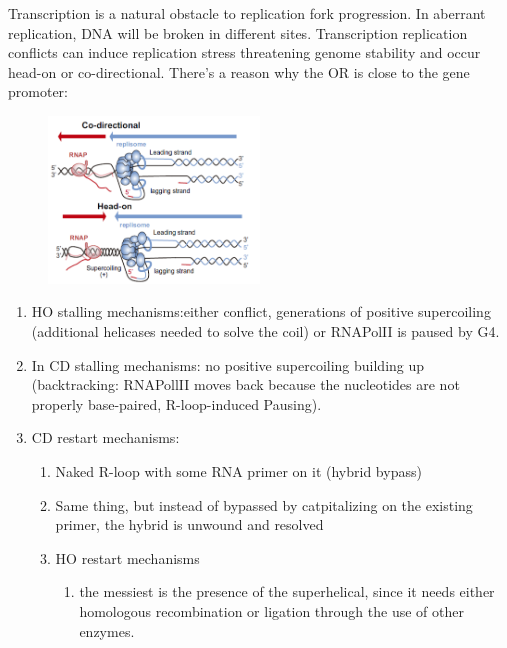 Transcription is a natural obstacle to replication fork progression. In
aberrant replication, DNA will be broken in different sites. 
Transcription replication conflicts can induce replication stress
threatening genome stability and
occur head-on or co-directional. There's a reason why the OR is close to
the gene promoter:

\begin{figure}[h!]
\centering
\includegraphics[width=0.5\textwidth]{../_resources/7e83b9f1b770e9e66657e633c833c9a4.png}
\label{fig:senescence}
\end{figure}

\begin{enumerate}
\def\labelenumi{\arabic{enumi}.}
\tightlist
\item
  HO stalling mechanisms:either conflict, generations of
  positive supercoiling (additional helicases needed to solve the coil)
  or RNAPolII is paused by G4.
\item
  In CD stalling mechanisms: no positive supercoiling building up
  (backtracking: RNAPollII moves back because the nucleotides are not
  properly base-paired, R-loop-induced Pausing).
\item
  CD restart mechanisms:

  \begin{enumerate}
  \def\labelenumii{\arabic{enumii}.}
  \tightlist
  \item
    Naked R-loop with some RNA primer on it (hybrid bypass)
  \item
    Same thing, but instead of bypassed by catpitalizing on the existing
    primer, the hybrid is unwound and resolved
  \item
    HO restart mechanisms

    \begin{enumerate}
    \def\labelenumiii{\arabic{enumiii}.}
    \tightlist
    \item
      the messiest is the presence of the superhelical, since it needs
      either homologous recombination or ligation through the use of other
      enzymes.
     
    \end{enumerate}
  \end{enumerate}
\end{enumerate}


